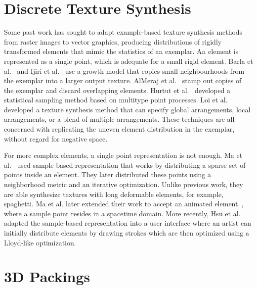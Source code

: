 \section{Discrete Texture Synthesis}
Some past work has sought to adapt example-based texture synthesis methods
from raster images to vector graphics, producing distributions of
rigidly transformed elements that mimic the statistics of an exemplar.
An element is represented as a single point, which is adequate for a small rigid element.
Barla et al.~\cite{Barla2006} and Ijiri et al.~\cite{Ijiri2008} use a growth model that copies small neighbourhoods
from the exemplar into a larger output texture.  AlMeraj et al.~\cite{AlMeraj2013}
stamp out copies of the exemplar and discard overlapping elements.
Hurtut et al.~\cite{Hurtut2009} developed a statistical sampling method based
on multitype point processes.  
Loi et al.~\cite{Loi2017} developed a texture synthesis method that
can specify global arrangements, local arrangements, or a blend of multiple arrangements.
These techniques are all concerned with replicating
the uneven element distribution in the exemplar, without regard for negative space.

For more complex elements, a single point representation is not enough.
Ma et al.~\cite{Ma2011} used sample-based representation 
that works by distributing a sparse set of points inside an element.
They later distributed these points using a neighborhood metric and an iterative optimization.
Unlike previous work, they are able synthesize textures with long deformable elements, for example, spaghetti.
Ma et al. later extended their work to accept an animated element~\cite{Ma2013}, where
a sample point resides in a spacetime domain.
More recently, Hsu et al.~\cite{Hsu2020} adapted the sample-based representation into a user interface
where an artist can initially distribute elements by drawing strokes
which are then optimized using a Lloyd-like optimization.


\section{3D Packings}

